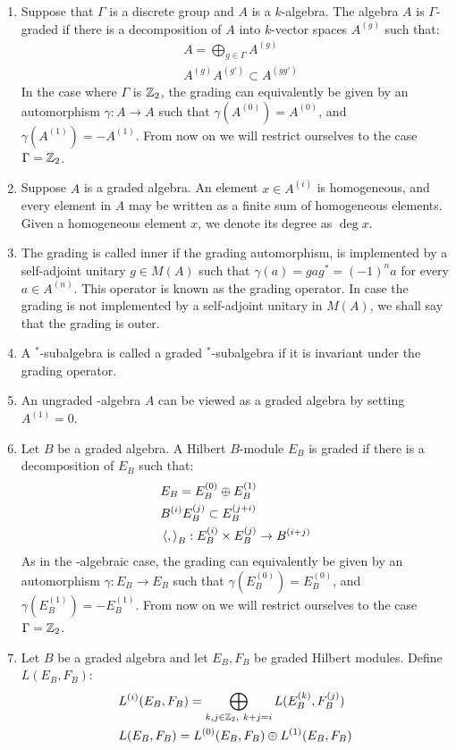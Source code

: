 \begin{definition}
\begin{enumerate}
\item Suppose that $\Gamma$ is a discrete group and $A$ is a $k$-algebra. The algebra $A$ is $\Gamma$-graded if there is a decomposition of $A$ into $k$-vector spaces $A^{(g)}$ such that:
\begin{align*}
	&A=\bigoplus_{g \in \Gamma} A^{(g)} \\
	&A^{(g)} A^{(g')}\subset A^{(g g')}
\end{align*}
In the case where $\Gamma$ is $\mathbb{Z}_2$, the grading can equivalently be given by an automorphism $\gamma:A\to A$ such that $\gamma(A^{(0)})=A^{(0)}$, and $\gamma(A^{(1)})=-A^{(1)}$. From now on we will restrict ourselves to the case $\Gamma=\mathbb{Z}_2$.  
\item	Suppose $A$ is a graded \Cstar algebra. An element $x\in A^{(i)}$ is homogeneous, and every element in $A$ may be written as a finite sum of homogeneous elements. Given a homogeneous element $x$, we denote its degree as $\deg x$. 
\item	The grading is called inner if the grading automorphism, is implemented by a self-adjoint unitary $g\in M(A)$ such that $\gamma(a)=gag^*=(-1)^n a$ for every $a\in A^{(n)}$. This operator is known as the grading operator. In case the grading is not implemented by a self-adjoint unitary in $M(A)$, we shall say that the grading is outer. 
\item 	 A $^*$-subalgebra is called a graded $^*$-subalgebra if it is invariant under the grading operator.
\item	 An ungraded \Cstar-algebra $A$ can be viewed as a graded algebra by setting $A^{(1)}=0$.  
\item 	 Let $B$ be a graded \Cstar algebra. A Hilbert $B$-module $E_B$ is graded if there is a decomposition of $E_B$ such that:
	\begin{align*}
		&E_B=E_B^{(0)}\oplus E_B^{(1)} \\
		&B^{(i)}E_B^{(j)}\subset E_B^{(j+i)} \\
		&\left \langle , \right \rangle_B:E_B^{(i)}\times E_B^{(j)}\to B^{(i+j)}
	\end{align*}
	As in the \Cstar-algebraic case, the grading can equivalently be given by an automorphism $\gamma:E_B\to E_B$ such that $\gamma(E_B^{(0)})=E_B^{(0)}$, and $\gamma(E_B^{(1)})=-E_B^{(1)}$. From now on we will restrict ourselves to the case $\Gamma=\mathbb{Z}_2$. 
\item 	 Let $B$ be a graded \Cstar algebra and let $E_B,F_B$ be graded Hilbert modules. Define $L(E_B,F_B)$:
	\begin{align*}
		&L^{(i)}(E_B,F_B)=\bigoplus_{k,j \in \mathbb{Z}_2,~k+j=i} L(E_B^{(k)},F_B^{(j)}) \\
		&L(E_B,F_B)=L^{(0)}(E_B,F_B)\oplus L^{(1)}(E_B,F_B)
	\end{align*}
\end{enumerate}
\end{definition}
